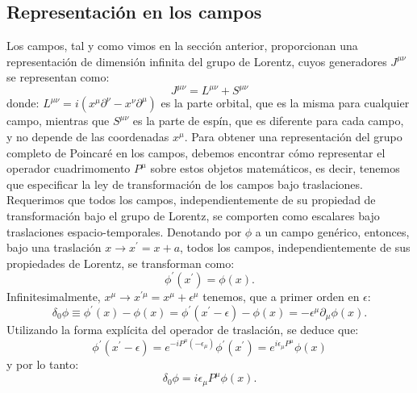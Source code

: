 \documentclass[a4paper,11pt]{book} %
\begin{document}
\subsection{Representación en los campos}
\noindent
Los campos, tal y como vimos en la sección anterior, proporcionan una representación de dimensión infinita del grupo de Lorentz, cuyos generadores $J^{\mu\nu}$ se representan como:
\begin{equation}
J^{\mu\nu}=L^{\mu\nu}+S^{\mu\nu}
\end{equation} 
\noindent
donde:
$
L^{\mu\nu}=i(x^{\mu}\partial^{\nu}-x^{\nu}\partial^{\mu})
$ es la parte orbital, que es la misma para cualquier campo, mientras que $S^{\mu\nu}$ es la parte de espín, que es diferente para cada campo, y no depende de las coordenadas $x^{\mu}$. 
\medskip\newline
Para obtener una representación del grupo completo de Poincaré en los campos, debemos encontrar cómo representar el operador cuadrimomento $P^{\mu}$ sobre estos objetos matemáticos, es decir, tenemos que especificar la ley de transformación de los campos bajo traslaciones. Requerimos que todos los campos, independientemente de su propiedad de transformación bajo el grupo de Lorentz, se comporten como escalares bajo traslaciones espacio-temporales.
\medskip\newline
Denotando por $\phi$ a un campo genérico, entonces, bajo una traslación $x\rightarrow x^{\prime}=x+a$, todos los campos, independientemente de sus propiedades de Lorentz, se transforman como:
\begin{equation}
\phi^{\prime}(x^{\prime})=\phi(x).
\end{equation} %
\noindent
Infinitesimalmente, $x^{\mu}\rightarrow x^{\prime\mu}=x^{\mu}+\epsilon^{\mu}$ tenemos, que a primer orden en $\epsilon$:
\begin{equation}
\delta_{0}\phi\equiv\phi^{\prime}(x)-\phi(x)=\phi^{\prime}(x^{\prime}-\epsilon)-\phi(x)=-\epsilon^{\mu}\partial_{\mu}\phi(x).
\end{equation} 
\noindent
Utilizando la forma explícita del operador de traslación, se deduce que:
\begin{equation}
\phi^{\prime}(x^{\prime}-\epsilon)=e^{-iP^{\mu}(-\epsilon_{\mu})}\phi^{\prime}(x^{\prime})=e^{i\epsilon_{\mu}P^{\mu}}\phi(x)
\end{equation}
y por lo tanto:
\begin{equation}
\delta_{0}\phi=i\epsilon_{\mu}P^{\mu}\phi(x).
\end{equation} 
\noindent
\end{document}
